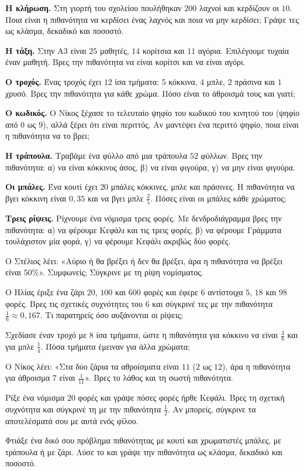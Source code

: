 \ex \textbf{Η κλήρωση.} Στη γιορτή του σχολείου πουλήθηκαν $200$ λαχνοί και κερδίζουν οι $10$. Ποια είναι η πιθανότητα να κερδίσει ένας λαχνός και ποια να μην κερδίσει; Γράψε τες ως κλάσμα, δεκαδικό και ποσοστό.

\ex \textbf{Η τάξη.} Στην Α3 είναι $25$ μαθητές, $14$ κορίτσια και $11$ αγόρια. Επιλέγουμε τυχαία έναν μαθητή. Βρες την πιθανότητα να είναι κορίτσι και να είναι αγόρι.

\ex \textbf{Ο τροχός.} Ένας τροχός έχει $12$ ίσα τμήματα: $5$ κόκκινα, $4$ μπλε, $2$ πράσινα και $1$ χρυσό. Βρες την πιθανότητα για κάθε χρώμα. Πόσο είναι το άθροισμά τους και γιατί;

\ex \textbf{Ο κωδικός.} Ο Νίκος ξέχασε το τελευταίο ψηφίο του κωδικού του κινητού του (ψηφίο από $0$ ως $9$), αλλά ξέρει ότι είναι περιττός. Αν μαντέψει ένα περιττό ψηφίο, ποια είναι η πιθανότητα να το βρει;

\ex \textbf{Η τράπουλα.} Τραβάμε ένα φύλλο από μια τράπουλα $52$ φύλλων. Βρες την πιθανότητα: α) να είναι κόκκινος άσος, β) να είναι φιγούρα, γ) να μην είναι φιγούρα.

\ex \textbf{Οι μπάλες.} Ένα κουτί έχει $20$ μπάλες κόκκινες, μπλε και πράσινες. Η πιθανότητα να βγει κόκκινη είναι $0{,}35$ και να βγει μπλε $\frac{2}{5}$. Πόσες είναι οι μπάλες κάθε χρώματος;

\ex \textbf{Τρεις ρίψεις.} Ρίχνουμε ένα νόμισμα τρεις φορές. Με δενδροδιάγραμμα βρες την πιθανότητα: α) να φέρουμε Κεφάλι και τις τρεις φορές, β) να φέρουμε Γράμματα τουλάχιστον μία φορά, γ) να φέρουμε Κεφάλι ακριβώς δύο φορές.


\ex Ο Στέλιος λέει: «Αύριο ή θα βρέξει ή δεν θα βρέξει, άρα η πιθανότητα να βρέξει είναι $50\%$». Συμφωνείς; Σύγκρινε με τη ρίψη νομίσματος.

\ex Ο Ηλίας έριξε ένα ζάρι $20$, $100$ και $600$ φορές και έφερε $6$ αντίστοιχα $5$, $18$ και $98$ φορές. Βρες τις σχετικές συχνότητες του $6$ και σύγκρινέ τες με την πιθανότητα $\frac{1}{6}\approx0{,}167$. Τι παρατηρείς όσο αυξάνονται οι ρίψεις;

\ex Σχεδίασε έναν τροχό με $8$ ίσα τμήματα, ώστε η πιθανότητα για κόκκινο να είναι $\frac{3}{8}$ και για μπλε $\frac{1}{4}$. Πόσα τμήματα έμειναν για άλλα χρώματα;

\ex Ο Νίκος λέει: «Στα δύο ζάρια τα αθροίσματα είναι $11$ ($2$ ως $12$), άρα η πιθανότητα για άθροισμα $7$ είναι $\frac{1}{11}$». Βρες το λάθος και τη σωστή πιθανότητα.


\ex Ρίξε ένα νόμισμα $20$ φορές και γράψε πόσες φορές ήρθε Κεφάλι. Βρες τη σχετική συχνότητα και σύγκρινέ τη με την πιθανότητα $\frac{1}{2}$. Αν μπορείς, σύγκρινε τα αποτελέσματά σου με αυτά ενός φίλου.

\ex Φτιάξε ένα δικό σου πρόβλημα πιθανότητας με κουτί και χρωματιστές μπάλες, με τράπουλα ή με ζάρι. Λύσε το και γράψε την πιθανότητα ως κλάσμα, δεκαδικό και ποσοστό.

